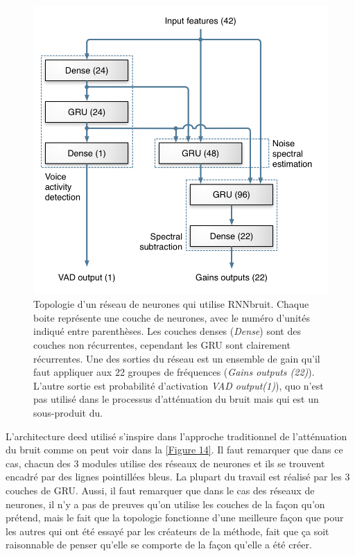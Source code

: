 \documentclass[conference,onecolumn]{IEEEtran}
\begin{document}
 \begin{figure}[H]
 \centering
    \includegraphics[scale=0.7]{topology.png}
    \caption{Topologie d’un réseau de neurones qui utilise RNNbruit. Chaque boite représente une couche de neurones, avec le numéro d’unités indiqué entre parenthèses. Les couches denses (\textit{Dense}) sont des couches non récurrentes, cependant les GRU sont clairement récurrentes. Une des sorties du réseau est un ensemble de gain qu’il faut appliquer aux 22 groupes de fréquences  (\textit{Gains outputs (22)}). L’autre sortie est probabilité d’activation  \textit{VAD output(1)}), quo n’est pas utilisé dans le processus d’atténuation du bruit mais qui est un sous-produit du.} 
\end{figure}
L’architecture deed utilisé s’inspire dans l’approche traditionnel de l’atténuation du bruit comme on peut voir dans la \ref{Figure 14}. Il faut remarquer que dans ce cas, chacun des 3 modules utilise des réseaux de neurones et ils se trouvent encadré par des lignes pointillées bleus. La plupart du travail est réalisé par les 3 couches de GRU. Aussi, il faut remarquer que dans le cas des réseaux de neurones, il n’y a pas de preuves qu’on utilise les couches de la façon qu’on prétend, mais le fait que la topologie fonctionne d’une meilleure façon que pour les autres qui ont été essayé par les créateurs de la méthode, fait que ça soit raisonnable de penser qu’elle se comporte de la façon qu’elle a été créer. 
\end{document}
